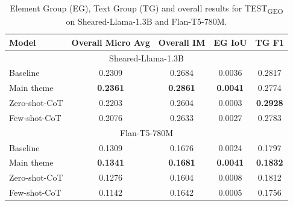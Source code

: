 \documentclass[11pt]{article}
\begin{document}
\clearpage
\begin{table}[h]
\caption{Element Group (EG), Text Group (TG) and overall results for TEST\textsubscript{GEO} on Sheared-Llama-1.3B and Flan-T5-780M.} \label{tab:table4}
\label{table:performance_test_geo}
\centering
\begin{tabular}{|l|c|c|c|c|}
\hline
\textbf{Model} & \textbf{Overall Micro Avg} & \textbf{Overall IM} & \textbf{EG IoU} & \textbf{TG F1} \\
\hline\multicolumn{5}{|c|}{Sheared-Llama-1.3B}\\
\hline
Baseline & 0.2309 & 0.2684 & 0.0036 & 0.2817 \\
\hline
Main theme & \textbf{0.2361} & \textbf{0.2861} & \textbf{0.0041} & 0.2774 \\
\hline
Zero-shot-CoT & 0.2203 & 0.2604 & 0.0003 & \textbf{0.2928} \\
\hline
Few-shot-CoT & 0.2076 & 0.2633 & 0.0027 & 0.2783 \\
\hline\multicolumn{5}{|c|}{Flan-T5-780M}\\
\hline
Baseline & 0.1309 & 0.1676 & 0.0024 & 0.1797 \\
\hline
Main theme & \textbf{0.1341} & \textbf{0.1681} & \textbf{0.0041} & \textbf{0.1832} \\
\hline
Zero-shot-CoT & 0.1276 & 0.1604 & 0.0008 & 0.1812 \\
\hline
Few-shot-CoT & 0.1142 & 0.1642 & 0.0005 & 0.1756 \\
\hline
\end{tabular}
\end{table}
\end{document}

